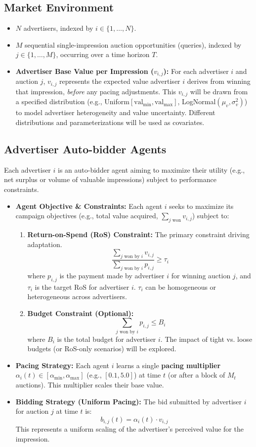 \documentclass[12pt, a4paper]{article}
\begin{document}
\subsection{Market Environment}
\begin{itemize}
    \item $N$ advertisers, indexed by $i \in \{1, \dots, N\}$.
    \item $M$ sequential single-impression auction opportunities (queries), indexed by $j \in \{1, \dots, M\}$, occurring over a time horizon $T$.
    \item \textbf{Advertiser Base Value per Impression ($v_{i,j}$):} For each advertiser $i$ and auction $j$, $v_{i,j}$ represents the expected value advertiser $i$ derives from winning that impression, \textit{before} any pacing adjustments. This $v_{i,j}$ will be drawn from a specified distribution (e.g., Uniform$[\text{val}_{\min}, \text{val}_{\max}]$, LogNormal$(\mu_v, \sigma_v^2)$) to model advertiser heterogeneity and value uncertainty. Different distributions and parameterizations will be used as covariates.
\end{itemize}

\subsection{Advertiser Auto-bidder Agents}
Each advertiser $i$ is an auto-bidder agent aiming to maximize their utility (e.g., net surplus or volume of valuable impressions) subject to performance constraints.
\begin{itemize}
    \item \textbf{Agent Objective \& Constraints:}
    Each agent $i$ seeks to maximize its campaign objectives (e.g., total value acquired, $\sum_{j \text{ won}} v_{i,j}$) subject to:
    \begin{enumerate}
        \item \textbf{Return-on-Spend (RoS) Constraint:} The primary constraint driving adaptation.
        \[ \frac{\sum_{j \text{ won by } i} v_{i,j}}{\sum_{j \text{ won by } i} p_{i,j}} \ge \tau_i \]
        where $p_{i,j}$ is the payment made by advertiser $i$ for winning auction $j$, and $\tau_i$ is the target RoS for advertiser $i$. $\tau_i$ can be homogeneous or heterogeneous across advertisers.
        \item \textbf{Budget Constraint (Optional):}
        \[ \sum_{j \text{ won by } i} p_{i,j} \le B_i \]
        where $B_i$ is the total budget for advertiser $i$. The impact of tight vs. loose budgets (or RoS-only scenarios) will be explored.
    \end{enumerate}
    \item \textbf{Pacing Strategy:} Each agent $i$ learns a single \textbf{pacing multiplier} $\alpha_i(t) \in [\alpha_{\min}, \alpha_{\max}]$ (e.g., $[0.1, 5.0]$) at time $t$ (or after a block of $M_t$ auctions). This multiplier scales their base value.
    \item \textbf{Bidding Strategy (Uniform Pacing):} The bid submitted by advertiser $i$ for auction $j$ at time $t$ is:
    \[ b_{i,j}(t) = \alpha_i(t) \cdot v_{i,j} \]
    This represents a uniform scaling of the advertiser's perceived value for the impression.
\end{itemize}
\end{document}
